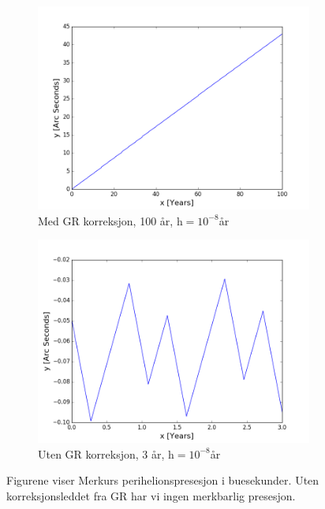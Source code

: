 \documentclass[11pt,a4paper]{article}
\begin{document}
\FloatBarrier
\begin{figure}[!ht]
\centering
\begin{subfigure}{.5\textwidth}
  \centering
  \includegraphics[width=1.1\linewidth]{arcs1.png}
  \caption{Med GR korreksjon, 100 år, h$ = 10^{-8}$år}
  \label{arc1}
\end{subfigure}%
\begin{subfigure}{.5\textwidth}
  \centering
  \includegraphics[width=1.1\linewidth]{arcs2.png}
  \caption{Uten GR korreksjon, 3 år, h$ = 10^{-8}$år}
  \label{arc2}
\end{subfigure}
\caption{Figurene viser Merkurs perihelionspresesjon i buesekunder. Uten korreksjonsleddet fra GR har vi ingen merkbarlig presesjon.}
\label{fig:uh}
\end{figure}
\FloatBarrier
\end{document}
